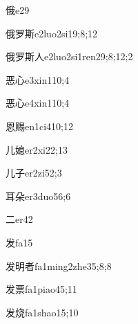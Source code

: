 \begin{verbete}{俄}{e2}{9}
\end{verbete}
\begin{verbete}{俄罗斯}{e2luo2si1}{9;8;12}
\end{verbete}
\begin{verbete}{俄罗斯人}{e2luo2si1ren2}{9;8;12;2}
\end{verbete}
\begin{verbete}{恶心}{e3xin1}{10;4}
\end{verbete}
\begin{verbete}{恶心}{e4xin1}{10;4}
\end{verbete}
\begin{verbete}{恩赐}{en1ci4}{10;12}
\end{verbete}
\begin{verbete}{儿媳}{er2xi2}{2;13}
\end{verbete}
\begin{verbete}{儿子}{er2zi5}{2;3}
\end{verbete}
\begin{verbete}{耳朵}{er3duo5}{6;6}
\end{verbete}
\begin{verbete}{二}{er4}{2}
\end{verbete}
\begin{verbete}{发}{fa1}{5}
\end{verbete}
\begin{verbete}{发明者}{fa1ming2zhe3}{5;8;8}
\end{verbete}
\begin{verbete}{发票}{fa1piao4}{5;11}
\end{verbete}
\begin{verbete}{发烧}{fa1shao1}{5;10}
\end{verbete}
